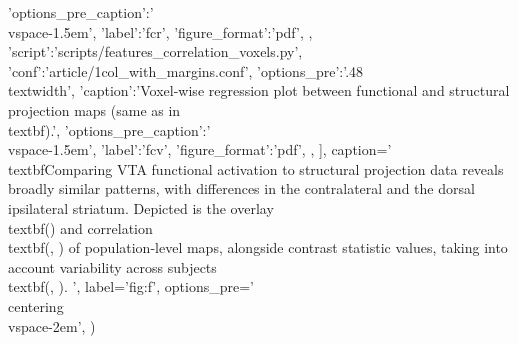 \begin{sansmath}
{{                        'options_pre_caption':'\\vspace{-1.5em}',
                        'label':'fcr',
                        'figure_format':'pdf',
                        },
                {'script':'scripts/features_correlation_voxels.py', 'conf':'article/1col_with_margins.conf', 'options_pre':'{.48\\textwidth}',
                        'caption':'Voxel-wise regression plot between functional and structural projection maps (same as in \\textbf{}).',
                        'options_pre_caption':'\\vspace{-1.5em}',
                        'label':'fcv',
                        'figure_format':'pdf',
                        },
                ],
        caption='
                \\textbf{Comparing VTA functional activation to structural projection data reveals broadly similar patterns, with differences in the contralateral and the dorsal ipsilateral striatum.}
                Depicted is the overlay \\textbf{()} and correlation \\textbf{(, )} of population-level maps, alongside contrast statistic values, taking into account variability across subjects \\textbf{(, )}.
                ',
        label='fig:f',
        options_pre='\\centering\n\\vspace{-2em}',
        )}
\end{sansmath}

